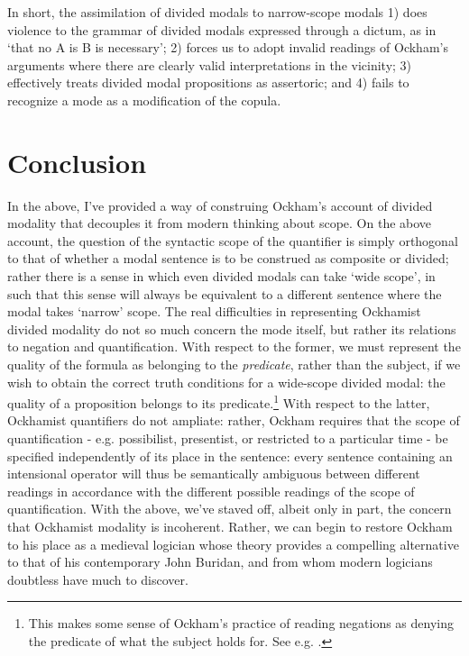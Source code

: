 \documentclass[a4paper]{article}
\begin{document}
In short, the assimilation of divided modals to narrow-scope modals 1) does violence to the grammar of divided modals expressed through a dictum, as in `that no A is B is necessary'; 2) forces us to adopt invalid readings of Ockham's arguments where there are clearly valid interpretations in the vicinity; 3) effectively treats divided modal propositions as assertoric; and 4) fails to recognize a mode as a modification of the copula.
\section{Conclusion}
In the above, I've provided a way of construing Ockham's account of divided modality that decouples it from modern thinking about scope. On the above account, the question of the syntactic scope of the quantifier is simply orthogonal to that of whether a modal sentence is to be construed as composite or divided; rather there is a sense in which even divided modals can take `wide scope', in such that this sense will always be equivalent to a different sentence where the modal takes `narrow' scope. The real difficulties in representing Ockhamist divided modality do not so much concern the mode itself, but rather its relations to negation and quantification. With respect to the former, we must represent the quality of the formula as belonging to the \textit{predicate}, rather than the subject, if we wish to obtain the correct truth conditions for a wide-scope divided modal: the quality of a proposition belongs to its predicate.\footnote{This makes some sense of Ockham's practice of reading negations as denying the predicate of what the subject holds for. See e.g. \cite[II. 2; 5]{OckhamSL2}.} With respect to the latter, Ockhamist quantifiers do not ampliate: rather, Ockham requires that the scope of quantification - e.g. possibilist, presentist, or restricted to a particular time - be specified independently of its place in the sentence: every sentence containing an intensional operator will thus be semantically ambiguous between different readings in accordance with the different possible readings of the scope of quantification. With the above, we've staved off, albeit only in part, the concern that Ockhamist modality is incoherent. Rather, we can begin to restore Ockham to his place as a medieval logician whose theory provides a compelling alternative to that of his contemporary John Buridan, and from whom modern logicians doubtless have much to discover. 

\printbibliography 
\end{document}
